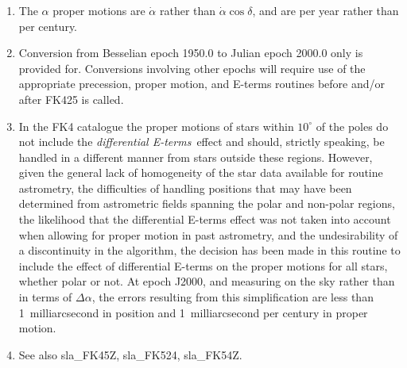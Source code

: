 {
  \\
  \\
  \\
  \\
  \\
}
{
  \\
  \\
  \\
  \\
  \\
}
\notes
{
 \begin{enumerate}
  \item The $\alpha$ proper motions are $\dot{\alpha}$ rather than
        $\dot{\alpha}\cos\delta$, and are per year rather than per century.
  \item Conversion from Besselian epoch 1950.0 to Julian epoch
        2000.0 only is provided for.  Conversions involving other
        epochs will require use of the appropriate precession,
        proper motion, and E-terms routines before and/or after FK425
        is called.
  \item In the FK4 catalogue the proper motions of stars within
        $10^{\circ}$ of the poles do not include the {\it differential
        E-terms}\, effect and should, strictly speaking, be handled
        in a different manner from stars outside these regions.
        However, given the general lack of homogeneity of the star
        data available for routine astrometry, the difficulties of
        handling positions that may have been determined from
        astrometric fields spanning the polar and non-polar regions,
        the likelihood that the differential E-terms effect was not
        taken into account when allowing for proper motion in past
        astrometry, and the undesirability of a discontinuity in
        the algorithm, the decision has been made in this routine to
        include the effect of differential E-terms on the proper
        motions for all stars, whether polar or not.  At epoch J2000,
        and measuring on the sky rather than in terms of $\Delta\alpha$,
        the errors resulting from this simplification are less than
        1~milliarcsecond in position and 1~milliarcsecond per
        century in proper motion.
  \item See also sla\_FK45Z, sla\_FK524, sla\_FK54Z.
 \end{enumerate}
}

